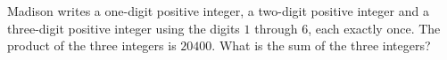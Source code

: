 Madison writes a one-digit positive integer, a two-digit positive integer and a three-digit positive integer using the digits $1$ through $6$, each exactly once. The product of the three integers is $20400$. What is the sum of the three integers?
